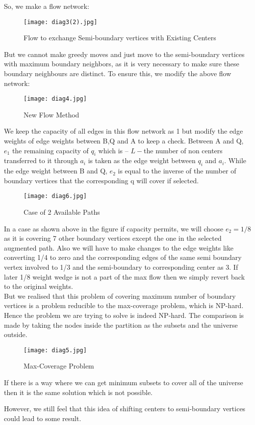 \documentclass[12pt,a4paper,onecolumn]{article}
\begin{document}
\begin{itemize}
So, we make a flow network:

\begin{flushleft}
\begin{figure}[H]
\texttt{[image: diag3(2).jpg]}
\caption{Flow to exchange Semi-boundary vertices with Existing Centers}
\end{figure}

\end{flushleft}
But we cannot make greedy moves and just move to the semi-boundary vertices with maximum boundary neighbors, as it is very necessary to make sure these boundary neighbours are distinct. To ensure this, we modify the above flow network:
\begin{center}
\begin{figure}[H]
\texttt{[image: diag4.jpg]}
\caption{New Flow Method}
\end{figure}
We keep the capacity of all edges in this flow network as 1 but modify the edge weights of edge weights between B,Q and A to keep a check. Between A and Q, $e_1$ the remaining capacity of $q_i$ which is -- $L-$the number of non centers transferred to it through $a_i$ is taken as the edge weight between $q_i$ and $a_i$. While the edge weight between B and Q, $e_2$ is equal to the inverse of the number of boundary vertices that the corresponding q will cover if selected. 
\begin{figure}[H]
\texttt{[image: diag6.jpg]}
\caption{Case of 2 Available Paths}
\end{figure}
\end{center}
In a case as shown above in the figure if capacity permits, we will choose $e_2 = 1/8$ as it is covering 7 other boundary vertices except the one in the selected augmented path. Also we will have to make changes to the edge weights like converting 1/4 to zero and the corresponding edges of the same semi boundary vertex involved to 1/3 and the semi-boundary to corresponding center as 3. If later 1/8 weight wedge is not a part of the max flow then we simply revert back to the original weights.\\
But we realised that this problem of covering maximum number of boundary vertices is a problem reducible to the max-coverage problem, which is NP-hard. Hence the problem we are trying to solve is indeed NP-hard. The comparison is made by taking the nodes inside the partition as the subsets and the universe outside. 
\begin{center}
\begin{figure}[H]
\texttt{[image: diag5.jpg]}
\caption{Max-Coverage Problem}
\end{figure}
\end{center}
If there is a way where we can get minimum subsets to cover all of the universe then it is the same solution which is not possible.

 However, we still feel that this idea of shifting centers to semi-boundary vertices could lead to some result. 
\end{itemize}
\end{document}
